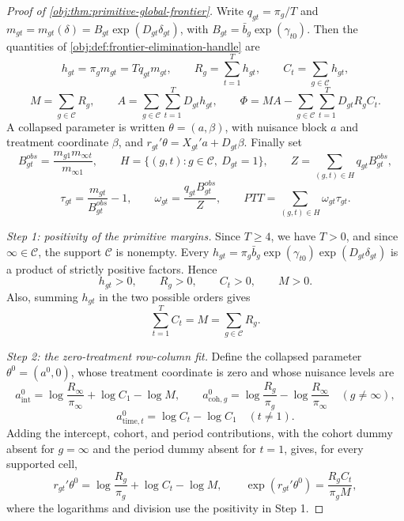 \documentclass[11pt]{article}
\begin{document}
\begin{proof}[Proof of \cref{obj:thm:primitive-global-frontier}]
Write \(q_{gt}=\pi_g/T\) and
\(m_{gt}=m_{gt}(\delta)=B_{gt}\exp(D_{gt}\delta_{gt})\), with
\(B_{gt}=\bar b_g\exp(\gamma_{t0})\). Then the quantities of
\cref{obj:def:frontier-elimination-handle} are
\[
h_{gt}=\pi_g m_{gt}=Tq_{gt}m_{gt},
\qquad
R_g=\sum_{t=1}^T h_{gt},
\qquad
C_t=\sum_{g\in\mathcal C}h_{gt},
\]
\[
M=\sum_{g\in\mathcal C}R_g,
\qquad
A=\sum_{g\in\mathcal C}\sum_{t=1}^T D_{gt}h_{gt},
\qquad
\Phi=MA-\sum_{g\in\mathcal C}\sum_{t=1}^T D_{gt}R_gC_t .
\]
A collapsed parameter is written \(\theta=(a,\beta)\), with nuisance block \(a\) and treatment coordinate \(\beta\), and
\(r_{gt}'\theta=X_{gt}'a+D_{gt}\beta\). Finally set
\[
B^{obs}_{gt}=\frac{m_{g1}m_{\infty t}}{m_{\infty 1}},
\qquad
H=\{(g,t):g\in\mathcal C,\ D_{gt}=1\},
\qquad
Z=\sum_{(g,t)\in H}q_{gt}B^{obs}_{gt},
\]
\[
\tau_{gt}=\frac{m_{gt}}{B^{obs}_{gt}}-1,
\qquad
\omega_{gt}=\frac{q_{gt}B^{obs}_{gt}}{Z},
\qquad
PTT=\sum_{(g,t)\in H}\omega_{gt}\tau_{gt} .
\]

\textit{Step 1: positivity of the primitive margins.} Since \(T\ge4\), we have \(T>0\), and since \(\infty\in\mathcal C\), the support \(\mathcal C\) is nonempty. Every
\(h_{gt}=\pi_g\bar b_g\exp(\gamma_{t0})\exp(D_{gt}\delta_{gt})\) is a product of strictly positive factors. Hence
\[
h_{gt}>0,
\qquad
R_g>0,
\qquad
C_t>0,
\qquad
M>0 .
\]
Also, summing \(h_{gt}\) in the two possible orders gives
\[
\sum_{t=1}^T C_t=M=\sum_{g\in\mathcal C}R_g .
\]

\textit{Step 2: the zero-treatment row-column fit.} Define the collapsed parameter \(\theta^0=(a^0,0)\), whose treatment coordinate is zero and whose nuisance levels are
\[
a^0_{\mathrm{int}}=\log\frac{R_\infty}{\pi_\infty}+\log C_1-\log M,
\qquad
a^0_{\mathrm{coh},g}=\log\frac{R_g}{\pi_g}-\log\frac{R_\infty}{\pi_\infty}\quad(g\neq\infty),
\]
\[
a^0_{\mathrm{time},t}=\log C_t-\log C_1\quad(t\neq1).
\]
Adding the intercept, cohort, and period contributions, with the cohort dummy absent for \(g=\infty\) and the period dummy absent for \(t=1\), gives, for every supported cell,
\[
r_{gt}'\theta^0=\log\frac{R_g}{\pi_g}+\log C_t-\log M,
\qquad
\exp(r_{gt}'\theta^0)=\frac{R_gC_t}{\pi_g M},
\]
where the logarithms and division use the positivity in Step 1.


\end{proof}
\end{document}
